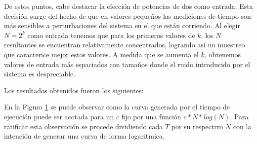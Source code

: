 	De estos puntos, cabe destacar la elección de potencias de dos como
	entrada. Esta decisión surge del hecho de que en valores pequeños las
	mediciones de tiempo son más sensibles a perturbaciones del sistema en el
	que están corriendo. Al elegir $N = 2^{k}$ como entrada tenemos que para los
	primeros valores de $k$, los $N$ resultantes se encuentran relativamente
	concentrados, logrando así un muestreo que caracterice mejor estos valores.
	A medida que se aumenta el $k$, obtenemos valores de entrada más espaciados
	con tamaños donde el ruido introducido por el sistema es despreciable.

	Los resultados obtenidos fueron los siguientes:

	\newcommand\constante{2.5}
	\begin{figure}[H]
		\centering
		\caption{}
		\label{fig:exp1:tiempo_base}
	\end{figure}

	En la Figura \ref{fig:exp1:tiempo_base} se puede observar como la curva generada por el
	tiempo de ejecución puede ser acotada para un $c$ fijo por una función
	$c*N*log(N)$. Para ratificar esta observación se procede dividiendo cada $T$
	por su respectivo $N$ con la intención de generar una curva de forma
	logarítmica.

	\begin{figure}[H]
		\centering
		\caption{}
		\label{fig:tiempo_sobre_n}
	\end{figure}


